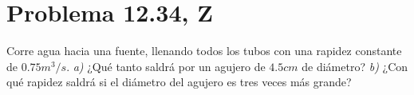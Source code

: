 \section*{Problema 12.34, Z}



Corre agua hacia una fuente, llenando todos los tubos con una rapidez constante de $0.75 m^3 /s$. \textit{a)} ¿Qué tanto saldrá por un agujero de $4.5cm$ de diámetro? \textit{b)} ¿Con qué rapidez saldrá si el diámetro del agujero es tres veces más grande?




